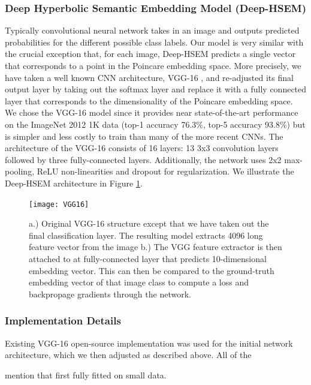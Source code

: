 \documentclass[12pt]{report}
\begin{document}
\subsubsection{Deep Hyperbolic Semantic Embedding Model (Deep-HSEM)}
Typically convolutional neural network takes in an image and outputs predicted probabilities for the different possible class labels. Our model is very similar with the crucial exception that, for each image, Deep-HSEM predicts a single vector that corresponds to a point in the Poincare embedding space. More precisely, we have taken a well known CNN architecture, VGG-16 \cite{Simonyan2014}, and re-adjusted its final output layer by taking out the softmax layer and replace it with a fully connected layer that corresponds to the dimensionality of the Poincare embedding space. We chose the VGG-16
model since it provides near state-of-the-art performance on the ImageNet 2012 1K data (top-1 accuracy 76.3\%, top-5 accuracy 93.8\%) but is simpler and less costly to train than many of the more recent CNNs. The architecture of the VGG-16 consists of 16 layers: 13 3x3 convolution layers followed by three fully-connected layers. Additionally, the network uses 2x2 max-pooling, ReLU non-linearities and dropout for regularization. We illustrate the Deep-HSEM architecture in Figure \ref{fig:dhsem}.

\begin{figure}
  \centering
  \texttt{[image: VGG16]}
  \caption{a.) Original VGG-16 structure except that we have taken out the final classification layer. The resulting model extracts 4096 long feature vector from the image b.) The VGG feature extractor is then attached to at fully-connected layer that predicts 10-dimensional embedding vector. This can then be compared to the ground-truth embedding vector of that image class to compute a loss and backpropage gradients through the network.}
  \label{fig:dhsem}
\end{figure}




\subsubsection{Implementation Details}
Existing VGG-16 open-source implementation  was used for the initial network architecture, which we then adjusted as described above. All of the 

mention that first fully fitted on small data.



\end{document}
